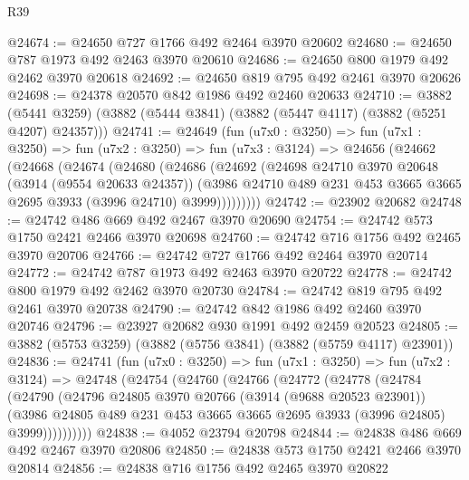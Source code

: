 \begin{lexlean}{R39}
\begin{coremodule}
@24674 := @24650 @727 @1766 @492 @2464 @3970 @20602
@24680 := @24650 @787 @1973 @492 @2463 @3970 @20610
@24686 := @24650 @800 @1979 @492 @2462 @3970 @20618
@24692 := @24650 @819 @795 @492 @2461 @3970 @20626
@24698 := @24378 @20570 @842 @1986 @492 @2460 @20633
@24710 := @3882
    (@5441 @3259)
    (@3882 (@5444 @3841) (@3882 (@5447 @4117) (@3882 (@5251 @4207) @24357)))
@24741 := @24649
    (fun (u7x0 : @3250) =>
    fun (u7x1 : @3250) =>
    fun (u7x2 : @3250) =>
    fun (u7x3 : @3124) =>
    @24656
      (@24662
        (@24668
          (@24674
            (@24680
              (@24686
                (@24692
                  (@24698
                    @24710
                    @3970
                    @20648
                    (@3914 (@9554 @20633 @24357))
                    (@3986
                      @24710
                      @489
                      @231
                      @453
                      @3665
                      @3665
                      @2695
                      @3933
                      (@3996 @24710)
                      @3999)))))))))
@24742 := @23902 @20682
@24748 := @24742 @486 @669 @492 @2467 @3970 @20690
@24754 := @24742 @573 @1750 @2421 @2466 @3970 @20698
@24760 := @24742 @716 @1756 @492 @2465 @3970 @20706
@24766 := @24742 @727 @1766 @492 @2464 @3970 @20714
@24772 := @24742 @787 @1973 @492 @2463 @3970 @20722
@24778 := @24742 @800 @1979 @492 @2462 @3970 @20730
@24784 := @24742 @819 @795 @492 @2461 @3970 @20738
@24790 := @24742 @842 @1986 @492 @2460 @3970 @20746
@24796 := @23927 @20682 @930 @1991 @492 @2459 @20523
@24805 := @3882 (@5753 @3259) (@3882 (@5756 @3841) (@3882 (@5759 @4117) @23901))
@24836 := @24741
    (fun (u7x0 : @3250) =>
    fun (u7x1 : @3250) =>
    fun (u7x2 : @3124) =>
    @24748
      (@24754
        (@24760
          (@24766
            (@24772
              (@24778
                (@24784
                  (@24790
                    (@24796
                      @24805
                      @3970
                      @20766
                      (@3914 (@9688 @20523 @23901))
                      (@3986
                        @24805
                        @489
                        @231
                        @453
                        @3665
                        @3665
                        @2695
                        @3933
                        (@3996 @24805)
                        @3999))))))))))
@24838 := @4052 @23794 @20798
@24844 := @24838 @486 @669 @492 @2467 @3970 @20806
@24850 := @24838 @573 @1750 @2421 @2466 @3970 @20814
@24856 := @24838 @716 @1756 @492 @2465 @3970 @20822

\end{coremodule}
\end{lexlean}
